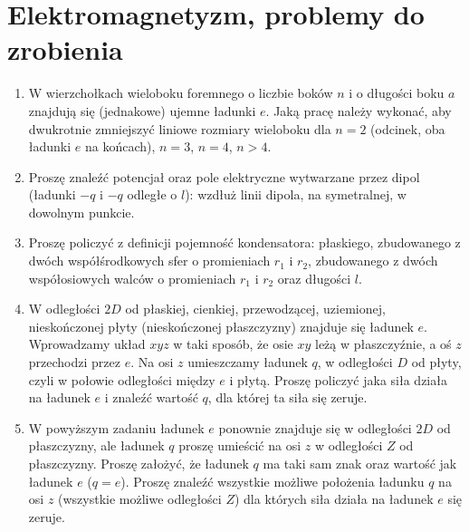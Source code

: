 \documentclass[a4paper,11pt]{article}
\begin{document}










\section{Elektromagnetyzm, problemy do zrobienia}





\begin{enumerate}

\item W wierzchołkach wieloboku foremnego o liczbie boków $n$ i o
  długości boku $a$ znajdują się (jednakowe) ujemne ładunki $e$. Jaką
  pracę należy wykonać, aby dwukrotnie zmniejszyć liniowe rozmiary
  wieloboku dla $n = 2$ (odcinek, oba ładunki $e$ na końcach),
  $n = 3$, $n = 4$, $n > 4$.

\item Proszę znaleźć potencjał oraz pole elektryczne wytwarzane przez
  dipol (ładunki $-q$ i $-q$ odległe o $l$): wzdłuż linii dipola, na
  symetralnej, w dowolnym punkcie.

\item Proszę policzyć z definicji pojemność kondensatora: płaskiego,
  zbudowanego z dwóch współśrodkowych sfer o promieniach $r_{ 1 }$ i
  $r_{ 2 }$, zbudowanego z dwóch współosiowych walców o promieniach
  $r_{ 1 }$ i $r_{ 2 }$ oraz długości $l$.

\item W odległości $2D$ od płaskiej, cienkiej, przewodzącej,
  uziemionej, nieskończonej płyty (nieskończonej płaszczyzny) znajduje
  się ładunek $e$. Wprowadzamy układ $xyz$ w taki sposób, że osie $xy$
  leżą w płaszczyźnie, a oś $z$ przechodzi przez $e$. Na osi $z$
  umieszczamy ładunek $q$, w odległości $D$ od płyty, czyli w połowie
  odległości między $e$ i płytą. Proszę policzyć jaka siła działa na
  ładunek $e$ i znaleźć wartość $q$, dla której ta siła się zeruje.

\item W powyższym zadaniu ładunek $e$ ponownie znajduje się w
  odległości $2D$ od płaszczyzny, ale ładunek $q$ proszę umieścić na
  osi $z$ w odległości $Z$ od płaszczyzny. Proszę założyć, że ładunek
  $q$ ma taki sam znak oraz wartość jak ładunek $e$ ($q = e$). Proszę
  znaleźć wszystkie możliwe położenia ładunku $q$ na osi $z$
  (wszystkie możliwe odległości $Z$) dla których siła działa na
  ładunek $e$ się zeruje.


\end{enumerate}
\end{document}
